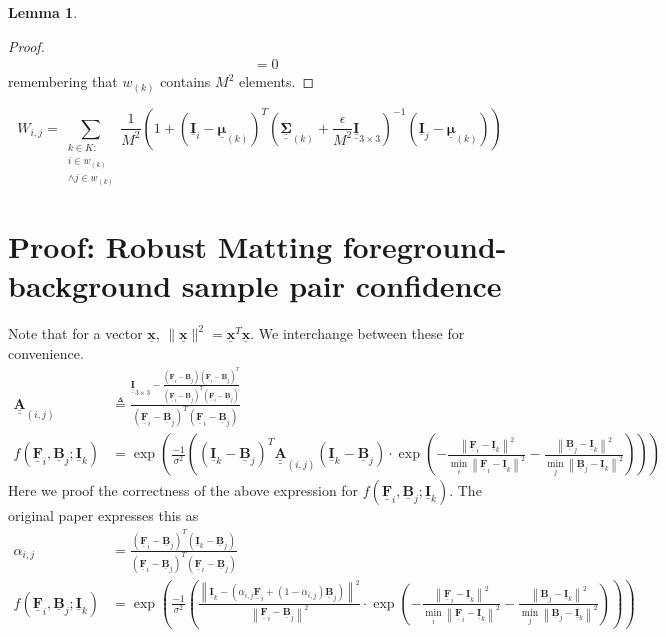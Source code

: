 \documentclass{article}
\theoremstyle{definition}
\newtheorem{lemma}[theorem]{Lemma}
\def\vt#1{\underline{\mathbf{#1}}}
\def\vts#1{\underline{\boldsymbol{#1}}}
\def\mt#1{\underline{\underline{\mathbf{#1}}}}
\def\mts#1{\underline{\underline{\boldsymbol{#1}}}}
\begin{document}
\begin{lemma}
\begin{proof}
\begin{align*}
            &= 0
        \end{align*}
        remembering that $w_{(k)}$ contains $M^2$ elements.
    \end{proof}
\end{lemma}



$$W_{i,j} = \sum_{\substack{k\in K:\\i\in w_{(k)}\\\wedge j\in w_{(k)}}} \frac1{M^2}\left(1 + \left(\vt{I}_i - \vts \mu_{(k)}\right)^T \left(\mts \Sigma_{(k)} + \frac\epsilon{M^2} \mt{I}_{3\times 3}\right)^{-1} \left(\vt{I}_j - \vts \mu_{(k)}\right) \right)$$

\newpage
\section{Proof: Robust Matting foreground-background sample pair confidence} \label{appendix:robust-confidence}
Note that for a vector $\vt x$, $\|\vt x\|^2 = \vt x^T\vt x$. We interchange between these for convenience.
\begin{align*}
    \mt A_{(i,j)} &\triangleq \frac{\mt I_{3\times 3} -  \frac{\left(\vt F_i - \vt B_j\right)\left(\vt F_i - \vt B_j\right)^T}{\left(\vt F_i - \vt B_j\right)^T\left(\vt F_i - \vt B_j\right)}}{\left(\vt F_i - \vt B_j\right)^T\left(\vt F_i - \vt B_j\right)} \\
    f(\vt F_i, \vt B_j; \vt I_k) &= \exp\left(\frac{-1}{\sigma^2} \left(
        \left(\vt I_k - \vt B_j \right)^T \mt A_{(i,j)}\left(\vt I_k - \vt B_j \right) \cdot \exp\left(  -\frac{\left\| \vt F_i - \vt I_k \right\|^2}{\min_i \left\| \vt F_i - \vt I_k \right\|^2} - \frac{\left\| \vt B_j - \vt I_k \right\|^2}{\min_j \left\| \vt B_j - \vt I_k \right\|^2} \right)
        \right)\right)
\end{align*}
Here we proof the correctness of the above expression for $f(\vt F_i, \vt B_j; \vt I_k)$. The original paper expresses this as
\begin{align*}
    \alpha_{i,j} &= \frac{\left(\vt F_i - \vt B_j\right)^T\left(\vt I_k - \vt B_j\right)}{\left(\vt F_i - \vt B_j\right)^T\left(\vt F_i - \vt B_j\right)} \\
    f(\vt F_i, \vt B_j; \vt I_k) &= \exp\left(\frac{-1}{\sigma^2} \left(
        \frac{\left\| \vt I_k - \left( \alpha_{i,j}\vt F_i + (1-\alpha_{i,j})\vt B_j\right)  \right\|^2}{\left\| \vt F_i - \vt B_j \right\|^2} \cdot \exp\left(  -\frac{\left\| \vt F_i - \vt I_k \right\|^2}{\min_i \left\| \vt F_i - \vt I_k \right\|^2} - \frac{\left\| \vt B_j - \vt I_k \right\|^2}{\min_j \left\| \vt B_j - \vt I_k \right\|^2} \right)
    \right)\right)
\end{align*}
\end{document}
